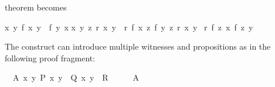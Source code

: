 \begin{isabellebody}
\begin{isamarkuptext}
theorem becomes \begin{isabelle}%
{}{}x\ y{}\ {}f\ x\ y\ {}\ {}f\ y\ x{}\isanewline
{}x\ y\ z{}\ {}r\ x\ y\ {}\ {}r\ {}{}f\ x\ z{}\ {}{}f\ y\ z{}{}\ {}r\ {}x\ {}y{}\isanewline
{}\ {}r\ {}{}f\ {}z\ {}x{}\ {}{}f\ {}z\ {}y{}%
\end{isabelle}
\tweakskip%
\end{isamarkuptext}%
\isamarkuptrue%
%
\isamarkuptrue%
%
\begin{isamarkuptext}%
The  construct can introduce multiple
witnesses and propositions as in the following proof fragment:%
\end{isamarkuptext}%
\isamarkuptrue%
\isamarkupfalse%
\ \ A{}\ {}{}x\ y{}\ P\ x\ y\ {}\ Q\ x\ y{}\ \ {}R{}\isanewline
%
\isadelimproof
%
\endisadelimproof
%
\isatagproof
{}\isamarkupfalse%
\ {}\isanewline
\ \ \isamarkupfalse%
\ A\ \isamarkupfalse%

\end{isabellebody}
